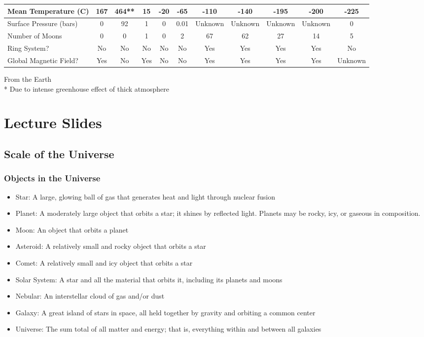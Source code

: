 \documentclass[12pt]{article}
\begin{document}
\begin{center}
{\begin{tabular}{|p{2.5cm}|*{10}{c|}}
    Mean Temperature (C) &  167 &  464** &  15 &  -20 &  -65 &  -110 &  -140 &  -195 &  -200 &  -225 \\ \hline
    Surface Pressure (bars) &  0 &  92 &  1 &  0 &  0.01 &  Unknown &  Unknown &  Unknown &  Unknown &  0 \\ \hline
    Number of Moons &  0 &  0 &  1 &  0 &  2 &  67 &  62 &  27 &  14 &  5 \\ \hline
    Ring System? &  No &  No &  No &  No &  No &  Yes &  Yes &  Yes &  Yes &  No \\ \hline
    Global Magnetic Field? &  Yes &  No &  Yes &  No &  No &  Yes &  Yes &  Yes &  Yes &  Unknown \\ \hline
    \end{tabular}
}
\end{center}
{\footnotesize * From the Earth}\\
{\footnotesize ** Due to intense greenhouse effect of thick atmosphere}\\


\section{Lecture Slides}
\subsection{Scale of the Universe}
\subsubsection{Objects in the Universe}
\begin{itemize}
\item Star:  A large, glowing ball of gas that generates heat and light through nuclear fusion
\item Planet: A moderately large object that orbits a star; it shines by reflected light. Planets may be rocky, icy, or gaseous in composition.
\item Moon: An object that orbits a planet
\item Asteroid: A relatively small and rocky object that orbits a star
\item Comet: A relatively small and icy object that orbits a star
\item Solar System: A star and all the material that orbits it, including its planets and moons
\item Nebular: An interstellar cloud of gas and/or dust
\item Galaxy: A great island of stars in space, all held together by gravity and orbiting a common center
\item Universe: The sum total of all matter and energy; that is, everything within and between all galaxies
\end{itemize}
\end{document}
